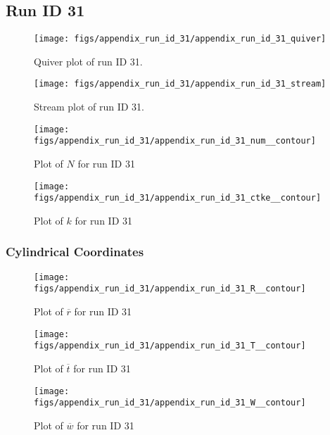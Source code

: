 \subsection{Run ID 31}
\begin{figure}[H]
\centering
\texttt{[image: figs/appendix\_run\_id\_31/appendix\_run\_id\_31\_quiver]}
\caption{Quiver plot of run ID 31.}
\label{fig:appendix_run_id_31_quiver}
\end{figure}


\begin{figure}[H]
\centering
\texttt{[image: figs/appendix\_run\_id\_31/appendix\_run\_id\_31\_stream]}
\caption{Stream plot of run ID 31.}
\label{fig:appendix_run_id_31_stream}
\end{figure}


\begin{figure}[H]
\centering
\texttt{[image: figs/appendix\_run\_id\_31/appendix\_run\_id\_31\_num\_\_contour]}
\caption{Plot of $N$ for run ID 31}
\label{fig:appendix_run_id_31_num__contour}
\end{figure}


\begin{figure}[H]
\centering
\texttt{[image: figs/appendix\_run\_id\_31/appendix\_run\_id\_31\_ctke\_\_contour]}
\caption{Plot of $k$ for run ID 31}
\label{fig:appendix_run_id_31_ctke__contour}
\end{figure}


\subsubsection{Cylindrical Coordinates}
\begin{figure}[H]
\centering
\texttt{[image: figs/appendix\_run\_id\_31/appendix\_run\_id\_31\_R\_\_contour]}
\caption{Plot of $\overline{r}$ for run ID 31}
\label{fig:appendix_run_id_31_R__contour}
\end{figure}


\begin{figure}[H]
\centering
\texttt{[image: figs/appendix\_run\_id\_31/appendix\_run\_id\_31\_T\_\_contour]}
\caption{Plot of $\overline{t}$ for run ID 31}
\label{fig:appendix_run_id_31_T__contour}
\end{figure}


\begin{figure}[H]
\centering
\texttt{[image: figs/appendix\_run\_id\_31/appendix\_run\_id\_31\_W\_\_contour]}
\caption{Plot of $\overline{w}$ for run ID 31}
\label{fig:appendix_run_id_31_W__contour}
\end{figure}


